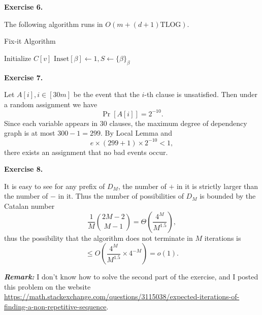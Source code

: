 \documentclass[a4paper]{article}
\newenvironment{exercise}[1]{
	\par
	\noindent\textbf{Exercise #1.}\quad
}{
	\par
	\bigskip
}
\newcommand{\pbra}[1]{\left( #1 \right)}
\newcommand{\sbra}[1]{\left[ #1 \right]}
\begin{document}
\begin{exercise}{6}
    The following algorithm runs in $O(m+(d+1)\mathrm{TLOG})$.

    \begin{algorithm}[H]
        \caption{Fix-it Algorithm}
        \DontPrintSemicolon
        Initialize $C[v]$\;
        $\mathrm{Inset}[\beta]\gets1,S\gets\{\beta\}_\beta$\;
    \end{algorithm}
\end{exercise}

\begin{exercise}{7}
    Let $A[i],i\in[30m]$ be the event that the $i$-th clause is unsatisfied. Then under a random assignment we have
    $$
    \Pr\sbra{A[i]}=2^{-10}.
    $$
    Since each variable appears in $30$ clauses, the maximum degree of dependency graph is at most $300-1=299$.
    By Local Lemma and 
    $$
    e\times(299+1)\times2^{-10}<1,
    $$
    there exists an assignment that no bad events occur.
\end{exercise}

\begin{exercise}{8}
    It is easy to see for any prefix of $D_M$, the number of $+$ in it is strictly larger than the number of $-$ in it.
    Thus the number of possibilities of $D_M$ is bounded by the Catalan number
    $$
    \frac1M\binom{2M-2}{M-1}=\Theta\pbra{\frac{4^M}{M^{1.5}}},
    $$
    thus the possibility that the algorithm does not terminate in $M$ iterations is 
    $$
    \leq O\pbra{\frac{4^M}{M^{1.5}}\times4^{-M}}=o(1).
    $$
\end{exercise}
\noindent\textbf{\it Remark:} 
I don't know how to solve the second part of the exercise, and I posted this problem on the website 
\url{https://math.stackexchange.com/questions/3115038/expected-iterations-of-finding-a-non-repetitive-sequence}.
\end{document}
